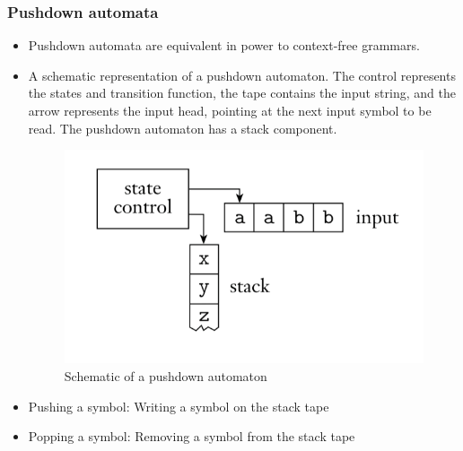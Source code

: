 \documentclass[11pt]{article}
\theoremstyle{definition}
\begin{document}
\subsubsection{Pushdown automata}
\begin{itemize}[leftmargin=*]
    \item Pushdown automata are equivalent in power to context-free grammars.
    \item A schematic representation of a pushdown automaton. The control represents the states and transition function, the tape contains the input string, and the arrow represents the input head, pointing at the next input symbol to be read. The pushdown automaton has a stack component.
    \begin{figure}[h]
    	\centering
    	\includegraphics[width=0.5\linewidth]{pda.png}
    	\caption{Schematic of a pushdown automaton}
    	\label{fig}
    \end{figure}
    \item Pushing a symbol: Writing a symbol on the stack tape
    \item Popping a symbol: Removing a symbol from the stack tape 
\end{itemize}
\end{document}
